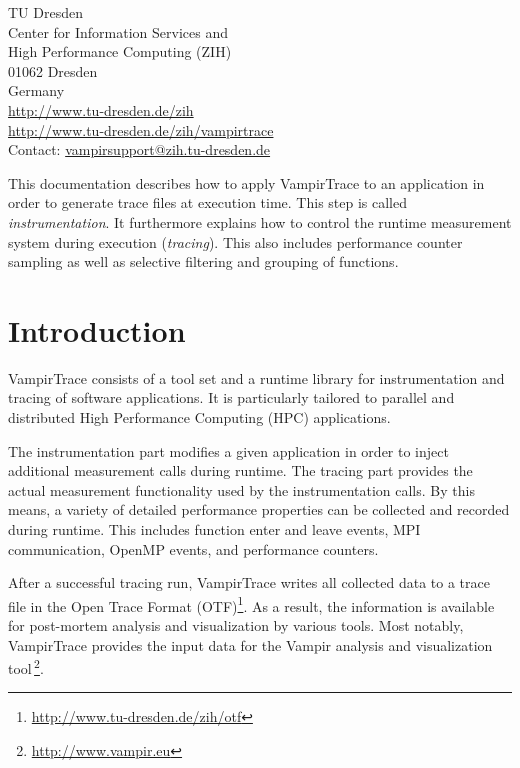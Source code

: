 \documentclass[a4paper,twoside,12pt,BCOR12mm]{scrbook}
\begin{document}
{\noindent}TU Dresden\\
Center for Information Services and \\High Performance Computing (ZIH)\\
01062 Dresden\\
Germany\\[1ex]
\url{http://www.tu-dresden.de/zih}\\
\url{http://www.tu-dresden.de/zih/vampirtrace}\\[1ex]
Contact: \href{mailto:vampirsupport@zih.tu-dresden.de}{vampirsupport@zih.tu-dresden.de}

\tableofcontents


\vfill
\noindent
This documentation describes how to apply VampirTrace to an application 
in order to generate trace files at execution time.
This step is called \textit{instrumentation}.
%
It furthermore explains how to control the runtime measurement system 
during execution (\textit{tracing}). 
This also includes performance counter sampling
as well as selective filtering and grouping of functions.


\mainmatter



\chapter{Introduction}

VampirTrace consists of a tool set and a runtime library for instrumentation 
and tracing of software applications. It is particularly tailored to
parallel and distributed High Performance Computing (HPC) applications.

The instrumentation part modifies a given application in order to inject
additional measurement calls during runtime. The tracing part provides 
the actual measurement functionality used by the instrumentation calls.
By this means, a variety of detailed performance properties can be collected 
and recorded during runtime. 
This includes function enter and leave events, MPI communication,
OpenMP events, and performance counters.

After a successful tracing run, VampirTrace writes all collected data to a  
trace file in the Open Trace Format (OTF)\footnote{\url{http://www.tu-dresden.de/zih/otf}}.
As a result, the information is available for post-mortem analysis and 
visualization by various tools. 
Most notably, VampirTrace provides the input data for the Vampir analysis  
and visualization tool\,\footnote{\url{http://www.vampir.eu}}. 
\end{document}
